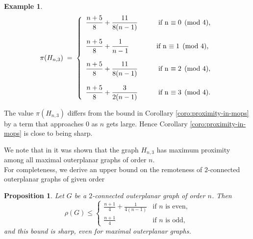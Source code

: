 \documentclass[a4paper,11pt]{article}
\newtheorem{proposition}[theorem]%
{Proposition}
\newtheorem{example}{Example}[section]
\numberwithin{equation}{theorem}
\begin{document}
\begin{example}
{\[\pi(H_{n,3}) \; = \; \left\{
 	\begin{array}{ll}
 	\dfrac{n+5}{8}+\dfrac{11}{8(n-1)} \quad \qquad\mbox{if n $ \equiv 0 \pmod 4$,}\\
 	\\
 	\dfrac{n+5}{8}+\dfrac{1}{n-1} \qquad\qquad \mbox{if n $ \equiv 1 \pmod 4$,}\\
 	\\
 	\dfrac{n+5}{8}+\dfrac{11}{8(n-1)}  \quad\qquad\mbox{if n $ \equiv  2 \pmod 4$,}\\
 	\\
 	\dfrac{n+5}{8}+\dfrac{3}{2(n-1)} \quad\qquad \mbox{if n  $ \equiv  3 \pmod 4$.}\\
 	\end{array}
 	\right.\]
    }
\end{example}

The value $\pi(H_{n,3})$ differs from the bound in Corollary \ref{coro:proximity-in-mops} by a term
that approaches $0$ as $n$ gets large. Hence Corollary \ref{coro:proximity-in-mops} is close 
to being sharp. 

We note that in \cite{Mal-PhD} it was shown that the graph $H_{n,3}$ has maximum proximity among all
maximal outerplanar graphs of order $n$. \\



For completeness, we derive an upper bound on the remoteness of 
$2$-connected outerplanar graphs of given order




\begin{proposition}
Let $G$ be a $2$-connected outerplanar graph of order $n$. Then 
\[\rho(G) \leq \left\{  \begin{array}{cc}
\frac{n+1}{4} + \frac{1}{4(n-1)} & \textrm{if $n$ is even,} \\ 
\frac{n+1}{4}  & \textrm{if $n$ is odd,} 
     \end{array} \right.   \]
and this bound is sharp, even for maximal outerplanar graphs. 
\end{proposition}
\end{document}
